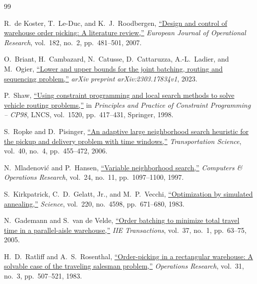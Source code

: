 \begingroup
\fontsize{10pt}{12pt}\selectfont
\begin{thebibliography}{99}
\setlength{\itemsep}{0pt}
\setlength{\parsep}{0pt}
\setlength{\parskip}{0pt}

R.~de Koster, T.~Le-Duc, and K.~J.~Roodbergen,
\href{https://doi.org/10.1016/j.ejor.2006.07.009}{``Design and control of warehouse order picking: A literature review,''}
\emph{European Journal of Operational Research}, vol.~182, no.~2, pp.~481--501, 2007.

O.~Briant, H.~Cambazard, N.~Catusse, D.~Cattaruzza, A.-L.~Ladier, and M.~Ogier,
\href{https://arxiv.org/abs/2303.17834v1}{``Lower and upper bounds for the joint batching, routing and sequencing problem,''}
\emph{arXiv preprint arXiv:2303.17834v1}, 2023.

P.~Shaw,
\href{https://doi.org/10.1007/3-540-49481-2_30}{``Using constraint programming and local search methods to solve vehicle routing problems,''}
in \emph{Principles and Practice of Constraint Programming -- CP98},
LNCS, vol.~1520, pp.~417--431, Springer, 1998.

S.~Ropke and D.~Pisinger,
\href{https://doi.org/10.1287/trsc.1050.0135}{``An adaptive large neighborhood search heuristic for the pickup and delivery problem with time windows,''}
\emph{Transportation Science}, vol.~40, no.~4, pp.~455--472, 2006.

N.~Mladenovi{\'c} and P.~Hansen,
\href{https://doi.org/10.1016/S0305-0548(97)00031-2}{``Variable neighborhood search,''}
\emph{Computers \& Operations Research}, vol.~24, no.~11, pp.~1097--1100, 1997.

S.~Kirkpatrick, C.~D.~Gelatt, Jr., and M.~P.~Vecchi,
\href{https://doi.org/10.1126/science.220.4598.671}{``Optimization by simulated annealing,''}
\emph{Science}, vol.~220, no.~4598, pp.~671--680, 1983.

N.~Gademann and S.~van de Velde,
\href{https://doi.org/10.1080/07408170590516917}{``Order batching to minimize total travel time in a parallel-aisle warehouse,''}
\emph{IIE Transactions}, vol.~37, no.~1, pp.~63--75, 2005.

H.~D.~Ratliff and A.~S.~Rosenthal,
\href{https://doi.org/10.1287/opre.31.3.507}{``Order-picking in a rectangular warehouse: A solvable case of the traveling salesman problem,''}
\emph{Operations Research}, vol.~31, no.~3, pp.~507--521, 1983.


\end{thebibliography}
